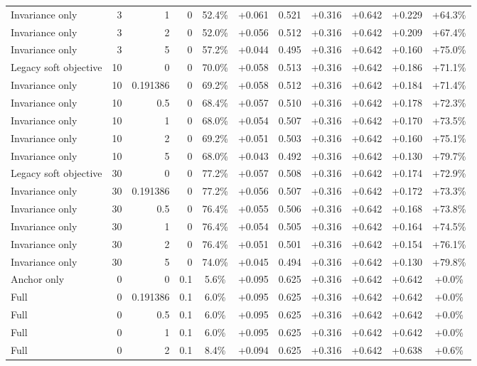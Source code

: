\begin{table}[htbp]
\begin{tabular}{lrrrccccccc}
Invariance only & 3 & 1 & 0 & 52.4\% & +0.061 & 0.521 & +0.316 & +0.642 & +0.229 & +64.3\% \\
Invariance only & 3 & 2 & 0 & 52.0\% & +0.056 & 0.512 & +0.316 & +0.642 & +0.209 & +67.4\% \\
Invariance only & 3 & 5 & 0 & 57.2\% & +0.044 & 0.495 & +0.316 & +0.642 & +0.160 & +75.0\% \\
Legacy soft objective & 10 & 0 & 0 & 70.0\% & +0.058 & 0.513 & +0.316 & +0.642 & +0.186 & +71.1\% \\
Invariance only & 10 & 0.191386 & 0 & 69.2\% & +0.058 & 0.512 & +0.316 & +0.642 & +0.184 & +71.4\% \\
Invariance only & 10 & 0.5 & 0 & 68.4\% & +0.057 & 0.510 & +0.316 & +0.642 & +0.178 & +72.3\% \\
Invariance only & 10 & 1 & 0 & 68.0\% & +0.054 & 0.507 & +0.316 & +0.642 & +0.170 & +73.5\% \\
Invariance only & 10 & 2 & 0 & 69.2\% & +0.051 & 0.503 & +0.316 & +0.642 & +0.160 & +75.1\% \\
Invariance only & 10 & 5 & 0 & 68.0\% & +0.043 & 0.492 & +0.316 & +0.642 & +0.130 & +79.7\% \\
Legacy soft objective & 30 & 0 & 0 & 77.2\% & +0.057 & 0.508 & +0.316 & +0.642 & +0.174 & +72.9\% \\
Invariance only & 30 & 0.191386 & 0 & 77.2\% & +0.056 & 0.507 & +0.316 & +0.642 & +0.172 & +73.3\% \\
Invariance only & 30 & 0.5 & 0 & 76.4\% & +0.055 & 0.506 & +0.316 & +0.642 & +0.168 & +73.8\% \\
Invariance only & 30 & 1 & 0 & 76.4\% & +0.054 & 0.505 & +0.316 & +0.642 & +0.164 & +74.5\% \\
Invariance only & 30 & 2 & 0 & 76.4\% & +0.051 & 0.501 & +0.316 & +0.642 & +0.154 & +76.1\% \\
Invariance only & 30 & 5 & 0 & 74.0\% & +0.045 & 0.494 & +0.316 & +0.642 & +0.130 & +79.8\% \\
Anchor only & 0 & 0 & 0.1 & 5.6\% & +0.095 & 0.625 & +0.316 & +0.642 & +0.642 & +0.0\% \\
Full & 0 & 0.191386 & 0.1 & 6.0\% & +0.095 & 0.625 & +0.316 & +0.642 & +0.642 & +0.0\% \\
Full & 0 & 0.5 & 0.1 & 6.0\% & +0.095 & 0.625 & +0.316 & +0.642 & +0.642 & +0.0\% \\
Full & 0 & 1 & 0.1 & 6.0\% & +0.095 & 0.625 & +0.316 & +0.642 & +0.642 & +0.0\% \\
Full & 0 & 2 & 0.1 & 8.4\% & +0.094 & 0.625 & +0.316 & +0.642 & +0.638 & +0.6\% \\

\end{tabular}
\end{table}

